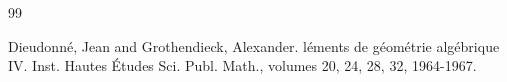 \begin{thebibliography}{99}

Dieudonn{\'e}, Jean and Grothendieck, Alexander.
l\'ements de g\'eom\'etrie alg\'ebrique IV.
\newblock Inst. Hautes \'Etudes Sci. Publ. Math., volumes 20, 24, 28, 32, 1964-1967.

\end{thebibliography}
